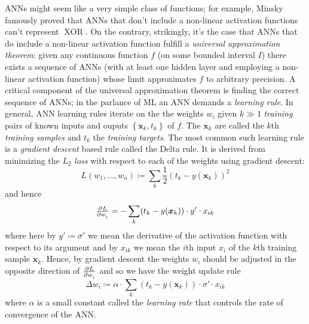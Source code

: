 ANNs might seem like a very simple class of functions; for example, Minsky \etal\cite{minsky2017perceptrons} famously proved that ANNs that don't include a non-linear activation functions can't represent \(\operatorname{XOR}\). 
%
On the contrary, strikingly, it's the case that ANNs that do include a non-linear activation function fulfill a \textit{universal approximation theorem}\cite{cybenko1989approximation}:
%
given any continuous function \(f\) (on some bounded interval \(I\)) there exists a sequence of ANNs (with at least one hidden layer and employing a non-linear activation function) whose limit approximates \(f\) to arbitrary precision.
%
A critical component of the universal approximation theorem is finding the correct sequence of ANNs; in the parlance of ML an ANN demands a \textit{learning rule}.
%
In general, ANN learning rules iterate on the the weights \(w_i\) given \(k \gg 1\) \textit{training} pairs of known inputs and ouputs \(\left\{ \bm{x}_k, t_k \right\}\) of \(f\). 
%
The \(\mathbf{x}_k\) are called the \(k\)th \textit{training samples} and \(t_k\) the  \textit{training targets}.
%
The most common such learning rule is a \textit{gradient descent} based rule called the Delta rule\cite{widrow1960adaptive}.
%
It is derived from minimizing the \(L_2\) \textit{loss} with respect to each of the weights using gradient descent:
\begin{equation}
    L(w_1, \dots, w_n) \coloneqq \sum_k \frac{1}{2} (t_k - y(\mathbf{x}_k))^2
    \label{eqn:loss}
\end{equation}
and hence
\begin{equation}
    \pd{L}{w_i} = - \sum_k(t_k-y(\bm{x}_k))\cdot y'\cdot x_{ik}
\end{equation}
where here by \(y' \coloneqq \sigma'\) we mean the derivative of the activation function with respect to its argument and by \(x_{ik}\) we mean the \(i\)th input \(x_i\) of the \(k\)th training sample \(\bm{x}_k\).
%
Hence, by gradient descent the weights \(w_i\) should be adjusted in the opposite direction of \(\pd{L}{w_i}\) and so we have the weight update rule
\begin{equation}
    \Delta w_i \coloneqq \alpha \cdot \sum_k(t_k-y(\mathbf{x}_k))\cdot \sigma'\cdot x_{ik}
    \label{eqn:batchupdate}
\end{equation}
where \(\alpha\) is a small constant called the \textit{learning rate} that controls the rate of convergence of the ANN.

